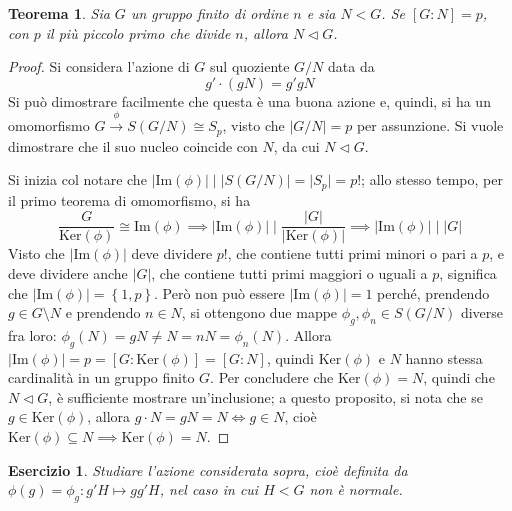 \documentclass[11pt]{scrartcl}
\theoremstyle{style}
\newtheorem{teorema}{Teorema}[section]
\newtheorem{esercizio}{Esercizio}[section]
\numberwithin{equation}{subsection}
\begin{document}
\begin{teorema}\label{snorm1}
	Sia $G$	un gruppo finito di ordine $n$ e sia $N<G$. 
	Se $[G:N]=p$, con $p$ il pi\`u piccolo primo che divide $n$, allora $N \lhd G$.
	\end{teorema}
\begin{proof}
	Si considera l'azione di $G$ sul quoziente $G / N$ data da 
	\[
	g' \cdot (gN) = g'gN
	\] 
	Si pu\`o dimostrare facilmente che questa \`e una buona azione e, quindi, si ha un omomorfismo $G \stackrel{\phi }{\longrightarrow } S(G/N) \cong S_p$, visto che $\lvert G / N \rvert = p$ per assunzione. 
Si vuole dimostrare che il suo nucleo coincide con $N$, da cui $N \lhd G$.

Si inizia col notare che $\lvert \mathrm{Im} (\phi ) \rvert  \mid \lvert S(G/N) \rvert = \lvert S_p \rvert =p!$; allo stesso tempo, per il primo teorema di omomorfismo, si ha 
\[
	\frac{G}{\mathrm{Ker} (\phi )}\cong \mathrm{Im} (\phi )\implies \lvert \mathrm{Im} (\phi ) \rvert  \mid \frac{\lvert G \rvert  }{\lvert \mathrm{Ker} (\phi ) \rvert }\implies \lvert \mathrm{Im} (\phi ) \rvert  \mid \lvert G \rvert 
\] 
Visto che $\lvert \mathrm{Im} (\phi ) \rvert  $ deve dividere $p!$, che contiene tutti primi minori o pari a $p$, e deve dividere anche $\lvert G \rvert $, che contiene tutti primi maggiori o uguali a $p$, significa che $\lvert \mathrm{Im} (\phi ) \rvert = \left\{ 1,p \right\} $.
Per\`o non pu\`o essere $|\mathrm{Im} (\phi )| =1$ perch\'e, prendendo $g \in G \setminus N$ e prendendo $n \in N$, si ottengono due mappe $\phi _g,\phi _n \in S(G / N)$ diverse fra loro: $\phi _g (N) = gN \neq N = nN=\phi _n(N)$.
Allora $\lvert \mathrm{Im} (\phi ) \rvert =p = [G : \mathrm{Ker} (\phi )] = [ G : N ]$, quindi $\mathrm{Ker} (\phi )$ e $ N$ hanno stessa cardinalit\`a in un gruppo finito $G$.
Per concludere che $\mathrm{Ker}( \phi) = N$, quindi che $N \lhd G$, \`e sufficiente mostrare un'inclusione; a questo proposito, si nota che se $g \in \mathrm{Ker} (\phi )$, allora $g \cdot N = gN = N \iff g \in N$, cio\`e $\mathrm{Ker} (\phi ) \subseteq N\implies \mathrm{Ker}( \phi ) = N$.
\end{proof}	
\begin{esercizio}
	Studiare l'azione considerata sopra, cio\`e definita da $\phi (g) = \phi _g : g'H \mapsto gg'H$, nel caso in cui $ H < G$ non \`e normale.
\end{esercizio}
\end{document}
